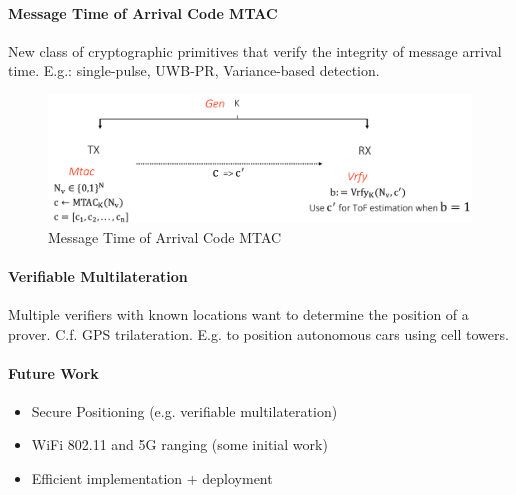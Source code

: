 \paragraph{Message Time of Arrival Code MTAC}
New class of cryptographic primitives that verify the integrity of message arrival time.
E.g.: single-pulse, UWB-PR, Variance-based detection.

\begin{figure}[h]
	\centering
	\includegraphics[scale=0.3]{images/5-mtac.png}
	\caption{Message Time of Arrival Code MTAC}%
	\label{fig:mtac}
\end{figure}

\paragraph{Verifiable Multilateration}
Multiple verifiers with known locations want to determine the position of a prover.
C.f. GPS trilateration.
E.g. to position autonomous cars using cell towers.

\paragraph{Future Work}
\begin{itemize}
	\item Secure Positioning (e.g. verifiable multilateration)
	\item WiFi 802.11 and 5G ranging (some initial work)
	\item Efficient implementation + deployment
\end{itemize}
